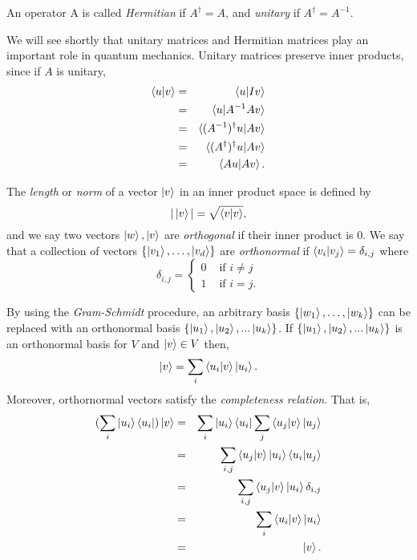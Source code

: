 {\begin{definition}
\label{def herm}
An operator A is called \textit{Hermitian} if $A^\dagger = A$, and \textit{unitary} if $A^\dagger =A^{-1}$. 
\end{definition}
We will see shortly that unitary matrices and Hermitian matrices play an important role in quantum mechanics.  Unitary matrices preserve inner products, since if $A$ is unitary,
\begin{eqnarray}
\braket{u|v} &=& \braket{u|Iv}\\
&=& \braket{u|A^{-1}Av}\\
&=& \braket{(A^{-1})^\dagger u|Av}\\
&=& \braket{(A^\dagger)^\dagger u|Av}\\
&=& \braket{Au|Av}.
\end{eqnarray}

The \textit{length} or \textit{norm} of a vector $\ket{v}$ in an inner product space is defined by
\begin{equation}
    |\ket{v}|=\sqrt{\braket{v|v}},
\end{equation}
and we say two vectors $\ket{w}, \ket{v}$ are \textit{orthogonal} if their inner product is 0.  We say that a collection of vectors $\{\ket{v_1},\hdots,\ket{v_d}\}$  are \textit{orthonormal} if $\braket{v_i | v_j}={\delta}_{i,j}$ where 
$${\delta}_{i,j}=
\begin{cases} 0 & \textrm{ if }i\neq j\\
1 & \textrm{ if } i=j.
\end{cases}$$


By using the \textit{Gram-Schmidt} procedure, an arbitrary basis $\{\ket{w_1},\hdots,\ket{w_k}\}$ can be replaced with an orthonormal basis $\{\ket{u_1}, \ket{u_2}, ...\ket{u_k}\}$.  If $\{\ket{u_1}, \ket{u_2}, ...\ket{u_k}\}$ is an orthonormal basis for $V$ and $\ket{v} \in V$ then, 
$$\ket{v}=\sum\limits_i\braket{u_i|v}\ket{u_i} .$$
Moreover, orthornormal vectors satisfy the \textit{completeness relation}.  That is, 
\begin{eqnarray*}
    (\sum_i \ket{u_i}\bra{u_i})\ket{v}&=&
    \sum_i \ket{u_i}\bra{u_i}\sum_j \braket{u_j|v} \ket{u_j}\\
    &=& \sum_{i,j}\braket{u_j|v}\ket{u_i}\braket{u_i|u_j}\\
    &=& \sum_{i,j}\braket{u_j|v}\ket{u_i}\delta_{i,j}\\
    &=&\sum_i \braket{u_i|v}\ket{u_i}\\
    &=&\ket{v}.
\end{eqnarray*}


}
